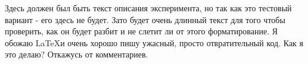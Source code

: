 Здесь должен был быть текст описания эксперимента, но так как это тестовый вариант - его здесь не будет. Зато будет очень длинный текст для того чтобы проверить, как он будет разбит и не слетит ли от этого форматирование. Я обожаю \LaTeX и очень хорошо пишу ужасный, просто отвратительный код. Как я это делаю? Откажусь от комментариев.